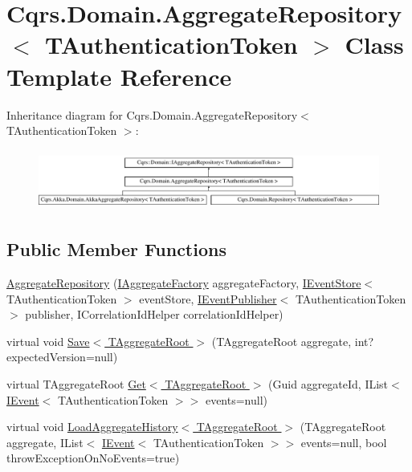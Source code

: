 \hypertarget{classCqrs_1_1Domain_1_1AggregateRepository}{}\section{Cqrs.\+Domain.\+Aggregate\+Repository$<$ T\+Authentication\+Token $>$ Class Template Reference}
\label{classCqrs_1_1Domain_1_1AggregateRepository}
Inheritance diagram for Cqrs.\+Domain.\+Aggregate\+Repository$<$ T\+Authentication\+Token $>$\+:\begin{figure}[H]
\begin{center}
\leavevmode
\includegraphics[height=2.000000cm]{classCqrs_1_1Domain_1_1AggregateRepository}
\end{center}
\end{figure}
\subsection*{Public Member Functions}
\begin{DoxyCompactItemize}
\item 
\hyperlink{classCqrs_1_1Domain_1_1AggregateRepository_ae4a6c96b10c536a0df6a381659f87744_ae4a6c96b10c536a0df6a381659f87744}{Aggregate\+Repository} (\hyperlink{interfaceCqrs_1_1Domain_1_1Factories_1_1IAggregateFactory}{I\+Aggregate\+Factory} aggregate\+Factory, \hyperlink{interfaceCqrs_1_1Events_1_1IEventStore}{I\+Event\+Store}$<$ T\+Authentication\+Token $>$ event\+Store, \hyperlink{interfaceCqrs_1_1Events_1_1IEventPublisher}{I\+Event\+Publisher}$<$ T\+Authentication\+Token $>$ publisher, I\+Correlation\+Id\+Helper correlation\+Id\+Helper)
\item 
virtual void \hyperlink{classCqrs_1_1Domain_1_1AggregateRepository_aff9e828d19a091a4275f635bee4b3c9b_aff9e828d19a091a4275f635bee4b3c9b}{Save$<$ T\+Aggregate\+Root $>$} (T\+Aggregate\+Root aggregate, int? expected\+Version=null)
\item 
virtual T\+Aggregate\+Root \hyperlink{classCqrs_1_1Domain_1_1AggregateRepository_a0e55881812d463129df34189d29544b6_a0e55881812d463129df34189d29544b6}{Get$<$ T\+Aggregate\+Root $>$} (Guid aggregate\+Id, I\+List$<$ \hyperlink{interfaceCqrs_1_1Events_1_1IEvent}{I\+Event}$<$ T\+Authentication\+Token $>$$>$ events=null)
\item 
virtual void \hyperlink{classCqrs_1_1Domain_1_1AggregateRepository_af26efcb464ac989962a9ad138466e4d7_af26efcb464ac989962a9ad138466e4d7}{Load\+Aggregate\+History$<$ T\+Aggregate\+Root $>$} (T\+Aggregate\+Root aggregate, I\+List$<$ \hyperlink{interfaceCqrs_1_1Events_1_1IEvent}{I\+Event}$<$ T\+Authentication\+Token $>$$>$ events=null, bool throw\+Exception\+On\+No\+Events=true)
\end{DoxyCompactItemize}
